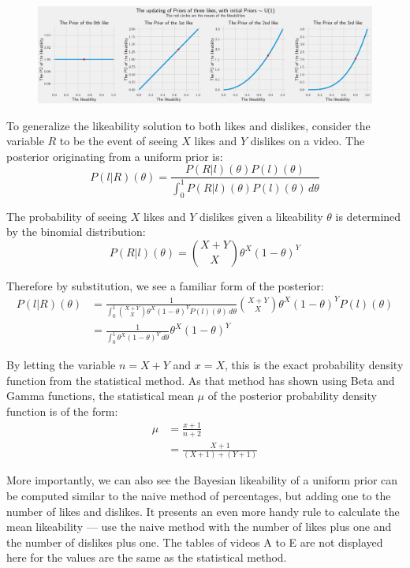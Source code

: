 \documentclass[a4paper,11pt]{article}
\begin{document}
\begin{figure}[H]
    \centering
    \includegraphics[width=\textwidth]{assets/updating_priors.png}
    \caption{}
    \label{fig:up}
\end{figure}

To generalize the likeability solution to both likes and dislikes, consider the variable $R$ to be the event of seeing $X$ likes and $Y$ dislikes on a video. The posterior originating from a uniform prior is:
\[
    P(l|R)(\theta) = \frac{P(R|l)(\theta) P(l)(\theta)}{\int_0^1 P(R|l)(\theta) P(l)(\theta) \, d\theta}
\]

The probability of seeing $X$ likes and $Y$ dislikes given a likeability $\theta$ is determined by the binomial distribution:
\[
    P(R|l)(\theta) = {X+Y \choose X} \theta^X (1-\theta)^Y
\]

Therefore by substitution, we see a familiar form of the posterior:
\begin{align*}
    P(l|R)(\theta) &= \frac{1}{\int_0^1 {X+Y \choose X} \theta^X (1-\theta)^Y P(l)(\theta)\,d\theta}{X+Y \choose X} \theta^X (1-\theta)^Y P(l)(\theta)\\
    &= \frac{1}{\int_0^1 \theta^X (1-\theta)^Y \,d\theta} \theta^X (1-\theta)^Y
\end{align*}

By letting the variable $n=X+Y$ and $x=X$, this is the exact probability density function from the statistical method. As that method has shown using Beta and Gamma functions, the statistical mean $\mu$ of the posterior probability density function is of the form:
\begin{align*}
    \mu &= \frac{x+1}{n+2}\\
    &= \frac{X+1}{(X+1) + (Y+1)}
\end{align*}

More importantly, we can also see the Bayesian likeability of a uniform prior can be computed similar to the naive method of percentages, but adding one to the number of likes and dislikes. It presents an even more handy rule to calculate the mean likeability --- use the naive method with the number of likes plus one and the number of dislikes plus one. The tables of videos A to E are not displayed here for the values are the same as the statistical method.
\end{document}
